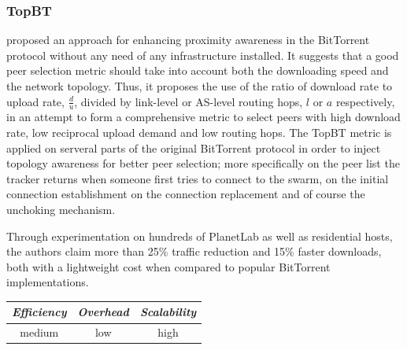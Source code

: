 \subsubsection{TopBT}
\cite{rtl_topbt_2010} proposed an approach for enhancing proximity awareness
in the BitTorrent protocol without any need of any infrastructure installed. It
suggests that a good peer selection metric should take into account both the
downloading speed and the network topology. Thus, it proposes the use of the
ratio of download rate to upload rate, $\frac{d}{u}$, divided by link-level or
AS-level routing hops, $l$ or $a$ respectively, in an attempt to form a
comprehensive metric to select peers with high download rate, low reciprocal
upload demand and low routing hops. The TopBT metric is applied on serveral
parts of the original BitTorrent protocol in order to inject topology awareness
for better peer selection; more specifically on the peer list the tracker
returns when someone first tries to connect to the swarm, on the initial
connection establishment on the connection replacement and of course the
unchoking mechanism.


Through experimentation on hundreds of PlanetLab as well as residential hosts,
the authors claim more than 25\% traffic reduction and 15\% faster downloads,
both with a lightweight cost when compared to popular BitTorrent
implementations.

\begin{center}
\begin{tabular}{ccc}
\emph{Efficiency} & \emph{Overhead} & \emph{Scalability} \\
\hline
medium &
low &
high
\end{tabular}
\end{center}

